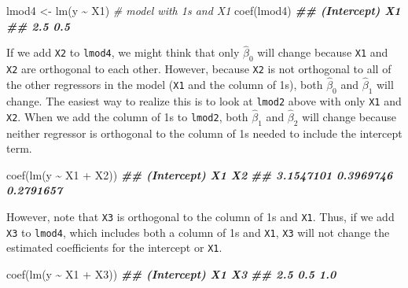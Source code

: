 \documentclass[
]{book}
\newenvironment{Shaded}{\begin{snugshade}}{\end{snugshade}}
\newcommand{\CommentTok}[1]{\textcolor[rgb]{0.56,0.35,0.01}{\textit{#1}}}
\newcommand{\DocumentationTok}[1]{\textcolor[rgb]{0.56,0.35,0.01}{\textbf{\textit{#1}}}}
\newcommand{\FunctionTok}[1]{\textcolor[rgb]{0.00,0.00,0.00}{#1}}
\newcommand{\NormalTok}[1]{#1}
\newcommand{\OtherTok}[1]{\textcolor[rgb]{0.56,0.35,0.01}{#1}}
\newcommand{\SpecialCharTok}[1]{\textcolor[rgb]{0.00,0.00,0.00}{#1}}
\theoremstyle{definition}
\theoremstyle{definition}
\theoremstyle{definition}
\theoremstyle{definition}
\theoremstyle{remark}
\begin{document}
\begin{Shaded}
\begin{Highlighting}[]
\NormalTok{lmod4 }\OtherTok{\textless{}{-}} \FunctionTok{lm}\NormalTok{(y }\SpecialCharTok{\textasciitilde{}}\NormalTok{ X1) }\CommentTok{\# model with 1s and X1}
\FunctionTok{coef}\NormalTok{(lmod4)}
\DocumentationTok{\#\# (Intercept)          X1 }
\DocumentationTok{\#\#         2.5         0.5}
\end{Highlighting}
\end{Shaded}

If we add \texttt{X2} to \texttt{lmod4}, we might think that only \(\hat{\beta}_{0}\)
will change because \texttt{X1} and \texttt{X2} are orthogonal to each other. However,
because \texttt{X2} is not orthogonal to all of the other regressors in the
model (\texttt{X1} and the column of 1s), both \(\hat{\beta}_{0}\) and
\(\hat{\beta}_1\) will change. The easiest way to realize this is to look
at \texttt{lmod2} above with only \texttt{X1} and \texttt{X2}. When we add the column of 1s
to \texttt{lmod2}, both \(\hat{\beta}_1\) and \(\hat{\beta}_2\) will change because
neither regressor is orthogonal to the column of 1s needed to include
the intercept term.

\begin{Shaded}
\begin{Highlighting}[]
\FunctionTok{coef}\NormalTok{(}\FunctionTok{lm}\NormalTok{(y }\SpecialCharTok{\textasciitilde{}}\NormalTok{ X1 }\SpecialCharTok{+}\NormalTok{ X2))}
\DocumentationTok{\#\# (Intercept)          X1          X2 }
\DocumentationTok{\#\#   3.1547101   0.3969746   0.2791657}
\end{Highlighting}
\end{Shaded}

However, note that \texttt{X3} is orthogonal to the column of 1s and \texttt{X1}.
Thus, if we add \texttt{X3} to \texttt{lmod4}, which includes both a column of 1s and
\texttt{X1}, \texttt{X3} will not change the estimated coefficients for the intercept
or \texttt{X1}.

\begin{Shaded}
\begin{Highlighting}[]
\FunctionTok{coef}\NormalTok{(}\FunctionTok{lm}\NormalTok{(y }\SpecialCharTok{\textasciitilde{}}\NormalTok{ X1 }\SpecialCharTok{+}\NormalTok{ X3))}
\DocumentationTok{\#\# (Intercept)          X1          X3 }
\DocumentationTok{\#\#         2.5         0.5         1.0}
\end{Highlighting}
\end{Shaded}
\end{document}
